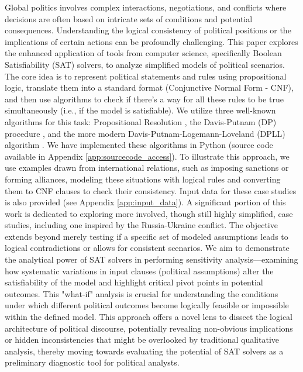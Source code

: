 \documentclass[11pt, a4paper]{article}
\begin{document}
Global politics involves complex interactions, negotiations, and conflicts where decisions are often based on intricate sets of conditions and potential consequences. Understanding the logical consistency of political positions or the implications of certain actions can be profoundly challenging. This paper explores the enhanced application of tools from computer science, specifically Boolean Satisfiability (SAT) solvers, to analyze simplified models of political scenarios. The core idea is to represent political statements and rules using propositional logic, translate them into a standard format (Conjunctive Normal Form - CNF), and then use algorithms to check if there's a way for all these rules to be true simultaneously (i.e., if the model is satisfiable). We utilize three well-known algorithms for this task: Propositional Resolution \cite{Robinson1965}, the Davis-Putnam (DP) procedure \cite{DavisPutnam1960}, and the more modern Davis-Putnam-Logemann-Loveland (DPLL) algorithm \cite{DPLL1962}. We have implemented these algorithms in Python (source code available in Appendix \ref{app:sourcecode_access}). To illustrate this approach, we use examples drawn from international relations, such as imposing sanctions or forming alliances, modeling these situations with logical rules and converting them to CNF clauses to check their consistency. Input data for these case studies is also provided (see Appendix \ref{app:input_data}). A significant portion of this work is dedicated to exploring more involved, though still highly simplified, case studies, including one inspired by the Russia-Ukraine conflict. The objective extends beyond merely testing if a specific set of modeled assumptions leads to logical contradictions or allows for consistent scenarios. We aim to demonstrate the analytical power of SAT solvers in performing sensitivity analysis—examining how systematic variations in input clauses (political assumptions) alter the satisfiability of the model and highlight critical pivot points in potential outcomes. This "what-if" analysis is crucial for understanding the conditions under which different political outcomes become logically feasible or impossible within the defined model. This approach offers a novel lens to dissect the logical architecture of political discourse, potentially revealing non-obvious implications or hidden inconsistencies that might be overlooked by traditional qualitative analysis, thereby moving towards evaluating the potential of SAT solvers as a preliminary diagnostic tool for political analysts.
\end{document}
